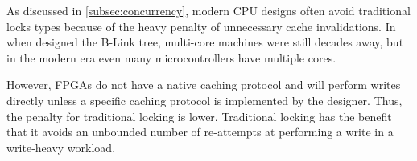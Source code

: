 
As discussed in \autoref{subsec:concurrency}, modern CPU designs often avoid
traditional locks types because of the heavy penalty of unnecessary cache
invalidations. In \citeyear{b-link} when \citeauthor{b-link} designed the B-Link
tree, multi-core machines were still decades away, but in the modern era even
many microcontrollers have multiple cores.

However, FPGAs do not have a native caching protocol and will perform writes
directly unless a specific caching protocol is implemented by the designer.
Thus, the penalty for traditional locking is lower. Traditional locking has the
benefit that it avoids an unbounded number of re-attempts at performing a write
in a write-heavy workload.




